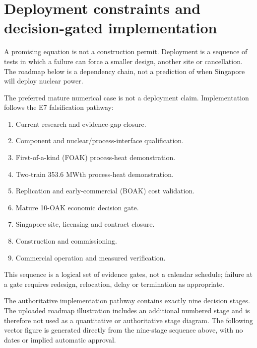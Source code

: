 \section{Deployment constraints and decision-gated implementation}\label{sec:deployment}

A promising equation is not a construction permit. Deployment is a sequence of tests in which a failure can force a smaller design, another site or cancellation. The roadmap below is a dependency chain, not a prediction of when Singapore will deploy nuclear power.

The preferred mature numerical case is not a deployment claim. Implementation follows the E7 falsification pathway:
\begin{enumerate}
\item Current research and evidence-gap closure.
\item Component and nuclear/process-interface qualification.
\item First-of-a-kind (FOAK) process-heat demonstration.
\item Two-train 353.6 MWth process-heat demonstration.
\item Replication and early-commercial (BOAK) cost validation.
\item Mature 10-OAK economic decision gate.
\item Singapore site, licensing and contract closure.
\item Construction and commissioning.
\item Commercial operation and measured verification.
\end{enumerate}
This sequence is a logical set of evidence gates, not a calendar schedule; failure at a gate requires redesign, relocation, delay or termination as appropriate.

The authoritative implementation pathway contains exactly nine decision stages. The uploaded roadmap illustration includes an additional numbered stage and is therefore not used as a quantitative or authoritative stage diagram. The following vector figure is generated directly from the nine-stage sequence above, with no dates or implied automatic approval.

